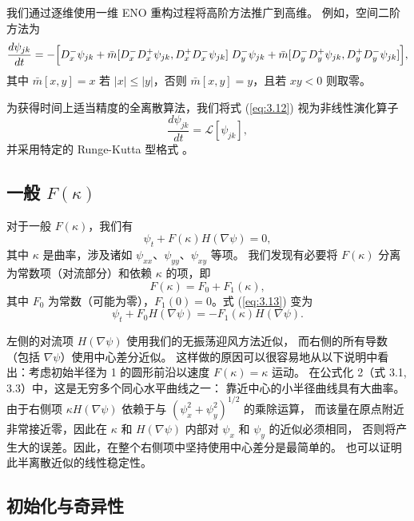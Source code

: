 \documentclass[11pt,a4paper]{article}
\begin{document}
我们通过逐维使用一维 ENO 重构过程将高阶方法推广到高维。
例如，空间二阶方法为
\begin{equation}
\frac{d\psi_{jk}}{dt} = -\Bigl[
    D_x^-\psi_{jk} + \bar{m}[D_x^- D_x^+\psi_{jk}, D_x^+ D_x^-\psi_{jk}] \;
    D_y^-\psi_{jk} + \bar{m}[D_y^- D_y^+\psi_{jk}, D_y^+ D_y^-\psi_{jk}]
\Bigr],
\label{eq:3.12}
\end{equation}
其中 $\bar{m}[x, y] = x$ 若 $|x| \leq |y|$，否则 $\bar{m}[x, y] = y$，且若 $xy < 0$ 则取零。

为获得时间上适当精度的全离散算法，我们将式 (\ref{eq:3.12}) 视为非线性演化算子
\begin{equation}
\frac{d\psi_{jk}}{dt} = \mathscr{L}[\psi_{jk}],
\end{equation}
并采用特定的 Runge-Kutta 型格式 \cite{shu1987}。

\subsection{一般 $F(\kappa)$}

对于一般 $F(\kappa)$，我们有
\begin{equation}
\psi_t + F(\kappa)H(\nabla\psi) = 0,
\label{eq:3.13}
\end{equation}
其中 $\kappa$ 是曲率，涉及诸如 $\psi_{xx}$、$\psi_{yy}$、$\psi_{xy}$ 等项。
我们发现有必要将 $F(\kappa)$ 分离为常数项（对流部分）和依赖 $\kappa$ 的项，即
\begin{equation}
F(\kappa) = F_0 + F_1(\kappa),
\end{equation}
其中 $F_0$ 为常数（可能为零），$F_1(0) = 0$。式 (\ref{eq:3.13}) 变为
\begin{equation}
\psi_t + F_0 H(\nabla\psi) = -F_1(\kappa) H(\nabla\psi).
\label{eq:3.14}
\end{equation}

左侧的对流项 $H(\nabla\psi)$ 使用我们的无振荡迎风方法近似，
而右侧的所有导数（包括 $\nabla\psi$）使用中心差分近似。
这样做的原因可以很容易地从以下说明中看出：考虑初始半径为 1 的圆形前沿以速度 $F(\kappa) = \kappa$ 运动。
在公式化 2（式 3.1, 3.3）中，这是无穷多个同心水平曲线之一：
靠近中心的小半径曲线具有大曲率。
由于右侧项 $\kappa H(\nabla\psi)$ 依赖于与 $(\psi_x^2 + \psi_y^2)^{1/2}$ 的乘除运算，
而该量在原点附近非常接近零，因此在 $\kappa$ 和 $H(\nabla\psi)$ 内部对 $\psi_x$ 和 $\psi_y$ 的近似必须相同，
否则将产生大的误差。因此，在整个右侧项中坚持使用中心差分是最简单的。
也可以证明此半离散近似的线性稳定性。

\subsection{初始化与奇异性}
\end{document}
